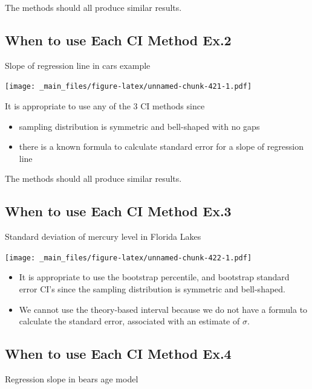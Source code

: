 \documentclass[]{book}
\providecommand{\tightlist}{%
  \setlength{\itemsep}{0pt}\setlength{\parskip}{0pt}}
\begin{document}
The methods should all produce similar results.

\subsection{When to use Each CI Method
Ex.2}\label{when-to-use-each-ci-method-ex.2}

Slope of regression line in cars example

\texttt{[image: \_main\_files/figure-latex/unnamed-chunk-421-1.pdf]}

It is appropriate to use any of the 3 CI methods since

\begin{itemize}
\tightlist
\item
  sampling distribution is symmetric and bell-shaped with no gaps\\
\item
  there is a known formula to calculate standard error for a slope of
  regression line
\end{itemize}

The methods should all produce similar results.

\subsection{When to use Each CI Method
Ex.3}\label{when-to-use-each-ci-method-ex.3}

Standard deviation of mercury level in Florida Lakes

\texttt{[image: \_main\_files/figure-latex/unnamed-chunk-422-1.pdf]}

\begin{itemize}
\tightlist
\item
  It is appropriate to use the bootstrap percentile, and bootstrap
  standard error CI's since the sampling distribution is symmetric and
  bell-shaped.\\
\item
  We cannot use the theory-based interval because we do not have a
  formula to calculate the standard error, associated with an estimate
  of \(\sigma\).
\end{itemize}

\subsection{When to use Each CI Method
Ex.4}\label{when-to-use-each-ci-method-ex.4}

Regression slope in bears age model
\end{document}
